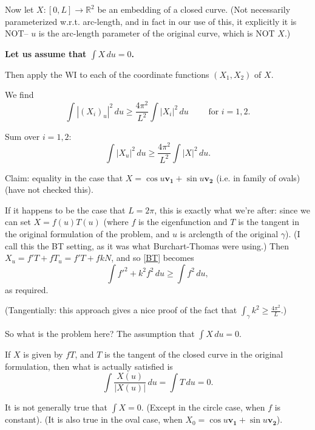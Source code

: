 \documentclass{amsart}
\begin{document}
\bigskip

Now let $X:[0,L]\rightarrow \mathbb{R}^2$ be an embedding of a closed curve.  (Not necessarily parameterized w.r.t. arc-length, and in fact in our use of this, it explicitly it is NOT-- $u$ is the arc-length parameter of the original curve, which is NOT $X$.)

\textbf{Let us assume that $\int X \,du =0$. }  

Then apply the WI to each of the coordinate functions $(X_1,X_2)$ of $X$.   

We find
\[ \int |(X_i)_u|^2 \,du \ge \frac{4\pi^2}{L^2}\int |X_i|^2\,du  \quad\quad \text{ for }i=1,2.\]

Sum over $i=1,2$: 
\[ \label{BT} \int |X_u|^2 \,du \ge \frac{4\pi^2}{L^2}\int |X|^2\,du .  \tag{BT}\]

Claim: equality in the case that $X=\cos u \mathbf{v_1}+ \sin u \mathbf{v_2}$ (i.e. in family of ovals) (have not checked this).

If it happens to be the case that $L=2\pi$, this is exactly what we're after:  since we can set $X=f(u)T(u)$ (where $f$ is the eigenfunction and $T$ is the tangent in the original formulation of the problem, and $u$ is arclength of the original $\gamma$).  (I call this the BT setting, as it was what Burchart-Thomas were using.)  Then $X_u= f' T+ fT_u= f'T+ fkN$, and so \eqref{BT} becomes
\[ \int f'^2 + k^2 f^2 \,du \ge \int f^2\,du, \]
as required.

(Tangentially:   this approach gives a nice proof of the fact that $\int_\gamma k^2 \ge \frac{4\pi^2}L$.)

So what is the problem here?  The assumption that $\int X \,du=0$.   

If $X$ is given by $fT$, and $T$ is the tangent of the closed curve in the original formulation, then what is actually satisfied is 
\[ \int \frac{X(u)}{|X(u)|}\,du = \int T \,du= 0.\]

It is not generally true that $\int X=0$.   (Except in the circle case, when $f$ is constant).   (It is also true in the oval case, when $X_0=\cos u \mathbf{v_1}+ \sin u \mathbf{v_2}$).   
\end{document}
